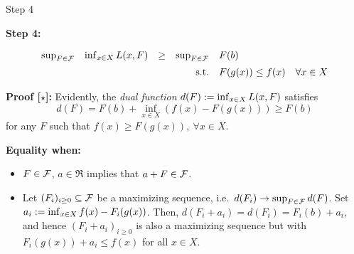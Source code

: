 \documentclass[9pt]{beamer}
\begin{document}
\begin{frame}{Step 4}

  \textbf{Step 4:}

  \[
    \begin{array}{rlcrl}
      \sup_{F\in \mathcal F} & \inf_{x\in X} L(x, F)  & \geq & \sup_{F\in \mathcal F} & F(b)  \\[0.5em]
      & & & \mathrm{s.t.} & F(g(x)) \leq f(x) \quad \forall x\in X \\
    \end{array}
  \]

  \vfill
  \textbf{Proof [$\star$]: }
  Evidently, the \emph{dual function} $d(F):= \inf_{x \in X} L(x, F)$ satisfies
  \[
    d(F) = F(b) + \inf_{x\in X} \left(f(x) - F(g(x))\right) \geq F(b)
  \]
  for any $F$ such that $f(x) \geq F(g(x)), ~\forall x\in X$.
  
  \vfill


  \textbf{Equality when:}
  \begin{itemize}
  \item<2-> $F\in \mathcal F$, $a\in\Re$ implies that $a+F \in \mathcal F$.
  \item<3-> Let $(F_i)_{i\geq 0} \subseteq \mathcal F$ be a maximizing sequence, i.e.\ $d(F_i) \to \sup_{F\in \mathcal F} d(F)$. Set $a_i:= \inf_{x\in X} f(x) - F_i(g(x))$. Then, $d(F_i+a_i) =d(F_i)=F_i(b)+a_i$, and hence $(F_i+a_i)_{i\geq 0}$ is also a maximizing sequence but with $F_i(g(x)) + a_i\leq f(x)$ for all $x\in X$.
  \end{itemize}
\end{frame}




\end{document}
